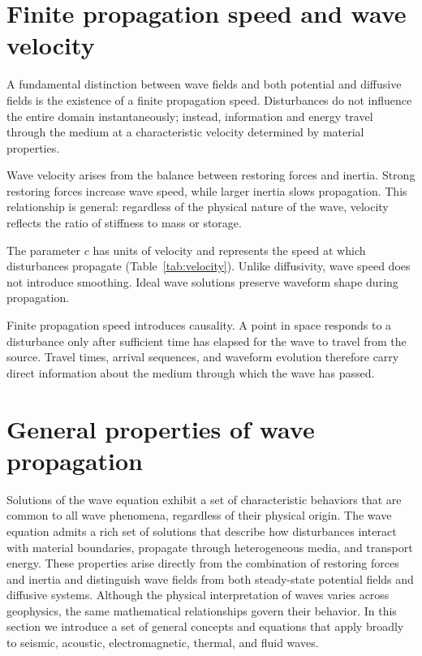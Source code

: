 \section{Finite propagation speed and wave velocity}

A fundamental distinction between wave fields and both potential and diffusive fields is the existence of a finite propagation speed. Disturbances do not influence the entire domain instantaneously; instead, information and energy travel through the medium at a characteristic velocity determined by material properties.

Wave velocity arises from the balance between restoring forces and inertia. Strong restoring forces increase wave speed, while larger inertia slows propagation. This relationship is general: regardless of the physical nature of the wave, velocity reflects the ratio of stiffness to mass or storage.

The parameter $c$ has units of velocity and represents the speed at which disturbances propagate (Table~\ref{tab:velocity}). Unlike diffusivity, wave speed does not introduce smoothing. Ideal wave solutions preserve waveform shape during propagation.


Finite propagation speed introduces causality. A point in space responds to a disturbance only after sufficient time has elapsed for the wave to travel from the source. Travel times, arrival sequences, and waveform evolution therefore carry direct information about the medium through which the wave has passed.


\section{General properties of wave propagation}

Solutions of the wave equation exhibit a set of characteristic behaviors that are common to all wave phenomena, regardless of their physical origin.  The wave equation admits a rich set of solutions that describe how disturbances interact with material boundaries, propagate through heterogeneous media, and transport energy. These properties arise directly from the combination of restoring forces and inertia and distinguish wave fields from both steady-state potential fields and diffusive systems.  Although the physical interpretation of waves varies across geophysics, the same mathematical relationships govern their behavior. In this section we introduce a set of general concepts and equations that apply broadly to seismic, acoustic, electromagnetic, thermal, and fluid waves.

